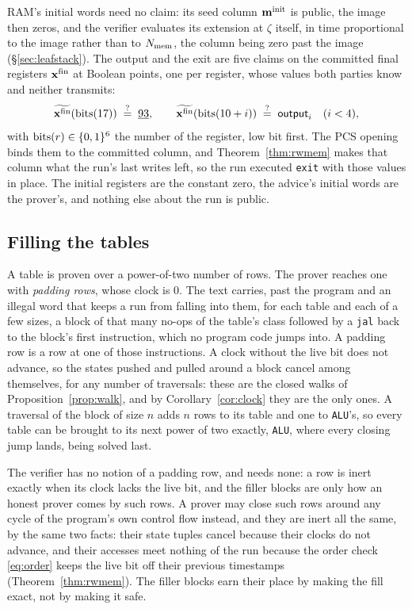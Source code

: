 RAM's initial words need no claim: its seed column $\mathbf{m}^{\mathrm{init}}$ is public, the image then zeros, and the verifier evaluates its extension at $\zeta$ itself, in time proportional to the image rather than to $N_{\mathrm{mem}}$, the column being zero past the image (\S\ref{sec:leafstack}). The output and the exit are five claims on the committed final registers $\mathbf{x}^{\mathrm{fin}}$ at Boolean points, one per register, whose values both parties know and neither transmits:
\[
  \widetilde{\mathbf{x}^{\mathrm{fin}}}(\mathrm{bits}(17))\;\stackrel{?}{=}\;\underline{93},\qquad \widetilde{\mathbf{x}^{\mathrm{fin}}}(\mathrm{bits}(10+i))\;\stackrel{?}{=}\;\textsf{output}_i\quad(i<4),
\]
with $\mathrm{bits}(r)\in\{0,1\}^{6}$ the number of the register, low bit first. The PCS opening binds them to the committed column, and Theorem~\ref{thm:rwmem} makes that column what the run's last writes left, so the run executed \texttt{exit} with those values in place. The initial registers are the constant zero, the advice's initial words are the prover's, and nothing else about the run is public.

\subsection{Filling the tables}\label{sec:e2e-pad}

A table is proven over a power-of-two number of rows. The prover reaches one with \emph{padding rows}, whose clock is $0$. The text carries, past the program and an illegal word that keeps a run from falling into them, for each table and each of a few sizes, a block of that many no-ops of the table's class followed by a \texttt{jal} back to the block's first instruction, which no program code jumps into. A padding row is a row at one of those instructions. A clock without the live bit does not advance, so the states pushed and pulled around a block cancel among themselves, for any number of traversals: these are the closed walks of Proposition~\ref{prop:walk}, and by Corollary~\ref{cor:clock} they are the only ones. A traversal of the block of size $n$ adds $n$ rows to its table and one to \texttt{ALU}'s, so every table can be brought to its next power of two exactly, \texttt{ALU}, where every closing jump lands, being solved last.

The verifier has no notion of a padding row, and needs none: a row is inert exactly when its clock lacks the live bit, and the filler blocks are only how an honest prover comes by such rows. A prover may close such rows around any cycle of the program's own control flow instead, and they are inert all the same, by the same two facts: their state tuples cancel because their clocks do not advance, and their accesses meet nothing of the run because the order check \eqref{eq:order} keeps the live bit off their previous timestamps (Theorem~\ref{thm:rwmem}). The filler blocks earn their place by making the fill exact, not by making it safe.

